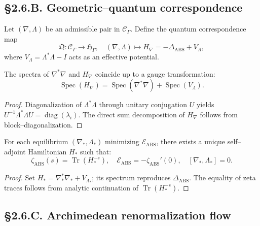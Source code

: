 \subsection*{§2.6.B. Geometric–quantum correspondence}

\begin{definition}
Let $(\nabla,\Lambda)$ be an admissible pair in $\mathcal{C}_\Gamma$.  
Define the quantum correspondence map
\[
\mathfrak{Q}:\mathcal{C}_\Gamma\longrightarrow\mathfrak{H}_\Gamma,
\quad
(\nabla,\Lambda)\mapsto H_\nabla = -\Delta_{\mathrm{ABS}} + V_\Lambda,
\]
where $V_\Lambda = \Lambda^\ast\Lambda - I$ acts as an effective potential.
\end{definition}

\begin{lemma}\label{lem:2.6.spec}
The spectra of $\nabla^\ast\nabla$ and $H_\nabla$ coincide up to a gauge transformation:
\[
\operatorname{Spec}(H_\nabla)=\operatorname{Spec}(\nabla^\ast\nabla)+\operatorname{Spec}(V_\Lambda).
\]
\end{lemma}

\begin{proof}
Diagonalization of $\Lambda^\ast\Lambda$ through unitary conjugation $U$ yields $U^{-1}\Lambda^\ast\Lambda U=\operatorname{diag}(\lambda_i)$.  
The direct sum decomposition of $H_\nabla$ follows from block–diagonalization.
\end{proof}

\begin{theorem}\label{thm:2.6.qs}
For each equilibrium $(\nabla_\ast,\Lambda_\ast)$ minimizing $\mathcal{E}_{\mathrm{ABS}}$, there exists a unique self–adjoint Hamiltonian $H_\ast$ such that:
\[
\zeta_{\mathrm{ABS}}(s)=\operatorname{Tr}(H_\ast^{-s}),
\quad
\mathcal{E}_{\mathrm{ABS}}=-\zeta_{\mathrm{ABS}}'(0),
\quad
[\nabla_\ast,\Lambda_\ast]=0.
\]
\end{theorem}

\begin{proof}
Set $H_\ast=\nabla_\ast^\ast\nabla_\ast+V_{\Lambda_\ast}$; its spectrum reproduces $\Delta_{\mathrm{ABS}}$.  
The equality of zeta traces follows from analytic continuation of $\operatorname{Tr}(H_\ast^{-s})$.
\end{proof}

\subsection*{§2.6.C. Archimedean renormalization flow}

